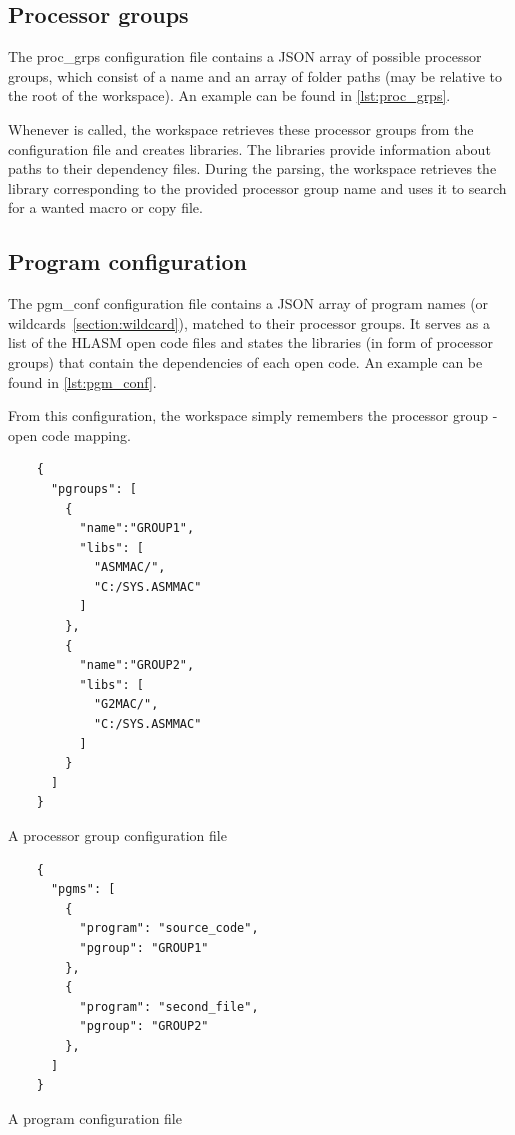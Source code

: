 \subsection{Processor groups}

The proc\_grps configuration file contains a JSON array of possible processor groups, which consist of a name and an array of folder paths (may be relative to the root of the workspace). An example can be found in \cref{lst:proc_grps}.

Whenever  is called, the workspace retrieves these processor groups from the configuration file and creates libraries. The libraries provide information about paths to their dependency files. During the parsing, the workspace retrieves the library corresponding to the provided processor group name and uses it to search for a wanted macro or copy file. 

\subsection{Program configuration}

The pgm\_conf configuration file contains a JSON array of program names (or wildcards~\ref{section:wildcard}), matched to their processor groups. It serves as a list of the HLASM open code files and states the libraries (in form of processor groups) that contain the dependencies of each open code. An example can be found in \cref{lst:pgm_conf}.


From this configuration, the workspace simply remembers the processor group - open code mapping.


\begin{listing}[t]
	\begin{verbatim}
	{
	  "pgroups": [
	    {
	      "name":"GROUP1",
	      "libs": [
	        "ASMMAC/",
	        "C:/SYS.ASMMAC"
	      ]
	    },
	    {
	      "name":"GROUP2",
	      "libs": [
	        "G2MAC/",
	        "C:/SYS.ASMMAC"
	      ]
	    }
	  ]
	}
	\end{verbatim}
	\caption{A processor group configuration file}
	\label{lst:proc_grps}
\end{listing}

\begin{listing}[t]
	\begin{verbatim}
	{
	  "pgms": [
	    {
	      "program": "source_code",
	      "pgroup": "GROUP1"
	    },
	    {
	      "program": "second_file",
	      "pgroup": "GROUP2"
	    },
	  ]
	}
	\end{verbatim}
	\caption{A program configuration file}
	\label{lst:pgm_conf}
\end{listing}

